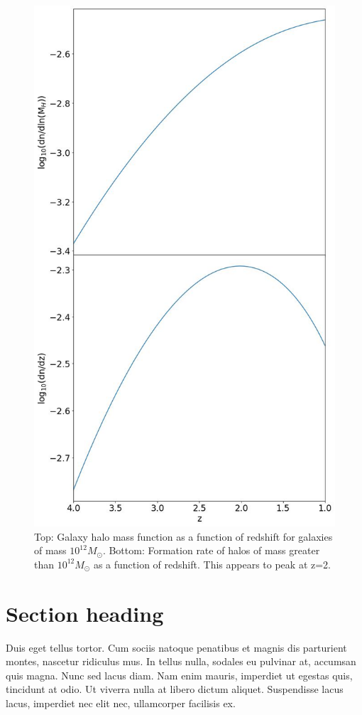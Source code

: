 \documentclass[12pt, twocolumn]{revtex4}    %
\begin{document}
\begin{figure}[H]
\centering
\includegraphics[width=12cm]{Plot_6.jpeg}
\caption{Top: Galaxy halo mass function as a function of redshift for galaxies of mass $10^{12}M_\odot$. Bottom: Formation rate of halos of mass greater than $10^{12}M_\odot$ as a function of redshift. This appears to peak at z=2.}
\label{fig:8}
\end{figure}
\twocolumngrid


\section{Section heading}

Duis eget tellus tortor. Cum sociis natoque penatibus et magnis dis parturient montes, nascetur ridiculus mus. In tellus nulla, sodales eu pulvinar at, accumsan quis magna. Nunc sed lacus diam. Nam enim mauris, imperdiet ut egestas quis, tincidunt at odio. Ut viverra nulla at libero dictum aliquet. Suspendisse lacus lacus, imperdiet nec elit nec, ullamcorper facilisis ex. \cite{Ikea} \cite{EAGLE}
\end{document}
